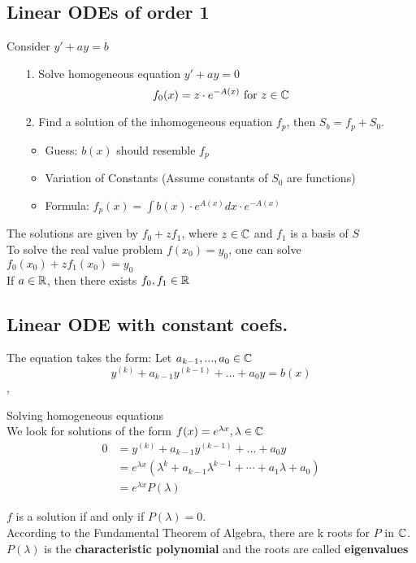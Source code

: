 \subsection{Linear ODEs of order 1}
\Procedure Consider $y' + ay = b $
\begin{enumerate}
\item[1.] Solve homogeneous equation $y' + ay = 0$ 
\[ f_0(x) = z \cdot e^{-A(x)} \text{ for } z \in \mathbb{C}\]
\item[2.] Find a solution of the inhomogeneous equation $f_p$, then $S_b  = f_p + S_0$.
\begin{itemize}
  \item Guess: $b(x)$ should resemble $f_p$
  \item Variation of Constants (Assume constants of $S_0$ are functions)
  \item Formula: $f_p(x) = \int b(x) \cdot e^{A(x)} dx \cdot e^{-A(x)}$
\end{itemize}
\end{enumerate}
\Bem The solutions are given by $f_0 + z f_1$, where $z \in \mathbb{C}$ and $f_1$ is a basis of $S$ \\
\Bem To solve the real value problem $f(x_0) = y_0$, one can solve $f_0(x_0) + z f_1(x_0) = y_0$ \\
\Bem If $a \in \mathbb{R}$, then there exists $f_0, f_1 \in \mathbb{R}$ \\

\subsection{Linear ODE with constant coefs. }
The equation takes the form: Let $a_{k - 1}, ..., a_0 \in \mathbb{C}$
\[ y^{(k)} + a_{k - 1} y^{(k - 1)} + ... + a_0 y = b(x) \] 
\sep

\Procedure Solving homogeneous equations \\
We look for solutions of the form $f(x) = e^{\lambda x}, \lambda \in \mathbb{C}$
\begin{align*}
0 &=y^{(k)} + a_{k - 1} y^{(k - 1)} + ... + a_0 y \\
&=  e^{\lambda x}( \lambda^k + a_{k - 1} \lambda^{k - 1} + \cdots + a_1 \lambda + a_0) \\
&= e^{\lambda x} P(\lambda)
\end{align*}

\Theorem $f$ is a solution if and only if $P(\lambda) = 0$. \\
\Bem According to the Fundamental Theorem of Algebra, there are k roots for $P$ in $\mathbb{C}$. \\
\Bem $P(\lambda)$ is the \textbf{characteristic polynomial} and the roots are called \textbf{eigenvalues}\\

